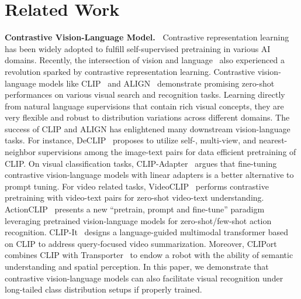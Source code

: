 \documentclass[10pt,twocolumn,letterpaper]{article}
\begin{document}
\section{Related Work}
\label{sec:related}
\noindent\textbf{Contrastive Vision-Language Model.~}
Contrastive representation learning has been widely adopted to fulfill self-supervised pretraining in various AI domains\cite{chen2020simple,he2020momentum,caron2020unsupervised,caron2021emerging,oord2018representation,gao2021simcse}. 
Recently, the intersection of vision and language~\cite{antol2015vqa,nguyen2018improved,yu2019deep,gao2019dynamic,kim2018bilinear,chen2019uniter,shi2020contrastive} also experienced a revolution sparked by contrastive representation learning. Contrastive vision-language models like CLIP~\cite{radford2021learning} and ALIGN~\cite{jia2021scaling} demonstrate promising zero-shot performances on various visual search and recognition tasks. Learning directly from natural language supervisions that contain rich visual concepts, they are very flexible and robust to distribution variations across different domains. The success of CLIP and ALIGN has enlightened many downstream vision-language tasks. For instance, DeCLIP~\cite{li2021supervision} proposes to utilize self-, multi-view, and nearest-neighbor supervisions among the image-text pairs for data efficient pretraining of CLIP. On visual classification tasks, 
CLIP-Adapter~\cite{gao2021clip} argues that fine-tuning contrastive vision-language models with linear adapters is a better alternative to prompt tuning. For video related tasks, VideoCLIP~\cite{xu2021videoclip} performs contrastive pretraining with video-text pairs for zero-shot video-text understanding. ActionCLIP~\cite{wang2021actionclip} presents a new ``pretrain, prompt and fine-tune'' paradigm leveraging pretrained vision-language models for zero-shot/few-shot action recognition. CLIP-It~\cite{narasimhan2021clip} designs a language-guided multimodal transformer based on CLIP to address query-focused video summarization. Moreover, CLIPort~\cite{shridhar2021cliport} combines CLIP with Transporter~\cite{zeng2020transporter} to endow a robot with the ability of semantic understanding and spatial perception. In this paper, we demonstrate that contrastive vision-language models can also facilitate visual recognition under long-tailed class distribution setups if properly trained.
\end{document}
